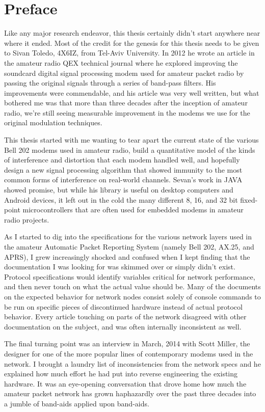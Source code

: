 \chapter*{Preface}

Like any major research endeavor, this thesis certainly didn't start anywhere near
where it ended.
Most of the credit for the genesis for this thesis needs to be given to 
Sivan Toledo, 4X6IZ, from Tel-Aviv University. In 2012 he wrote an article in the
amateur radio QEX technical journal where he explored improving the soundcard 
digital signal processing modem used for amateur packet radio by passing the 
original signals through a series of band-pass filters. His improvements were
commendable, and his article was very well written, but what bothered me was that 
more than three decades after the inception of amateur radio, we're still seeing
measurable improvement in the modems we use for the original modulation techniques.

This thesis started with me wanting to tear apart the current state of the various
Bell 202 modems used in amateur radio, build a quantitative model of the kinds of
interference and distortion that each modem handled well, and hopefully design
a new signal processing algorithm that showed immunity to the most common forms of
interference on real-world channels. Sevan's work in JAVA showed promise, but 
while his library is useful on desktop computers and Android devices, it left 
out in the cold the many different 8, 16, and 32 bit fixed-point microcontrollers
that are often used for embedded modems in amateur radio projects.

As I started to dig into the specifications for the various network layers used
in the amateur Automatic Packet Reporting System (namely Bell 202, AX.25, and
APRS), I grew increasingly shocked and confused when I kept finding that the
documentation I was looking for was skimmed over or simply didn't exist. 
Protocol specifications would identify variables critical for network performance,
and then never touch on what the actual value should be. Many of the documents
on the expected behavior for network nodes consist solely of console commands
to be run on specific pieces of discontinued hardware instead of actual protocol
behavior. Every article touching on parts of the network disagreed with 
other documentation on the subject, and was often internally inconsistent as well.

The final turning point was an interview in March, 2014 with Scott Miller, the
designer for one of the more popular lines of contemporary modems used in the
network.
I brought a laundry list of inconsistencies from the network specs and he
explained how much effort he had put into reverse engineering the existing 
hardware. It was an eye-opening conversation that drove home how much the 
amateur packet network has grown haphazardly over the past three decades into
a jumble of band-aids applied upon band-aids.

